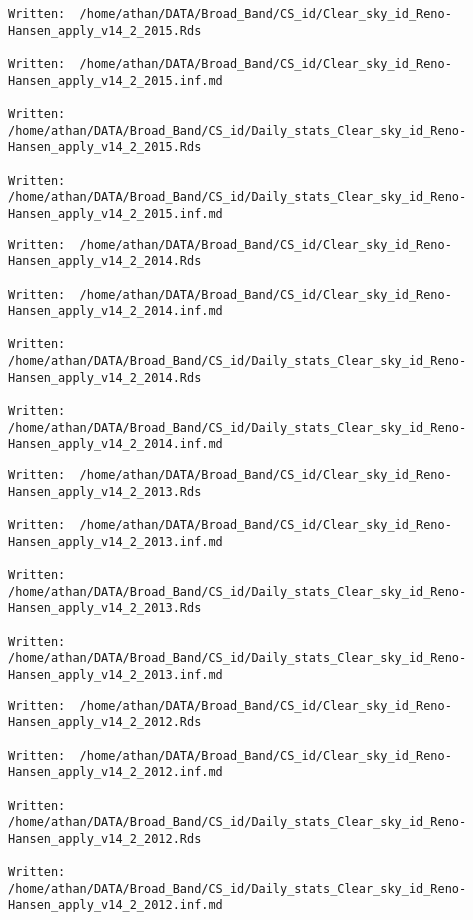 \documentclass[
  10pt,
  a4paper,oneside]{article}
\begin{document}
\begin{verbatim}
Written:  /home/athan/DATA/Broad_Band/CS_id/Clear_sky_id_Reno-Hansen_apply_v14_2_2015.Rds 

Written:  /home/athan/DATA/Broad_Band/CS_id/Clear_sky_id_Reno-Hansen_apply_v14_2_2015.inf.md 

Written:  /home/athan/DATA/Broad_Band/CS_id/Daily_stats_Clear_sky_id_Reno-Hansen_apply_v14_2_2015.Rds 

Written:  /home/athan/DATA/Broad_Band/CS_id/Daily_stats_Clear_sky_id_Reno-Hansen_apply_v14_2_2015.inf.md 
\end{verbatim}

\begin{verbatim}
Written:  /home/athan/DATA/Broad_Band/CS_id/Clear_sky_id_Reno-Hansen_apply_v14_2_2014.Rds 

Written:  /home/athan/DATA/Broad_Band/CS_id/Clear_sky_id_Reno-Hansen_apply_v14_2_2014.inf.md 

Written:  /home/athan/DATA/Broad_Band/CS_id/Daily_stats_Clear_sky_id_Reno-Hansen_apply_v14_2_2014.Rds 

Written:  /home/athan/DATA/Broad_Band/CS_id/Daily_stats_Clear_sky_id_Reno-Hansen_apply_v14_2_2014.inf.md 
\end{verbatim}

\begin{verbatim}
Written:  /home/athan/DATA/Broad_Band/CS_id/Clear_sky_id_Reno-Hansen_apply_v14_2_2013.Rds 

Written:  /home/athan/DATA/Broad_Band/CS_id/Clear_sky_id_Reno-Hansen_apply_v14_2_2013.inf.md 

Written:  /home/athan/DATA/Broad_Band/CS_id/Daily_stats_Clear_sky_id_Reno-Hansen_apply_v14_2_2013.Rds 

Written:  /home/athan/DATA/Broad_Band/CS_id/Daily_stats_Clear_sky_id_Reno-Hansen_apply_v14_2_2013.inf.md 
\end{verbatim}

\begin{verbatim}
Written:  /home/athan/DATA/Broad_Band/CS_id/Clear_sky_id_Reno-Hansen_apply_v14_2_2012.Rds 

Written:  /home/athan/DATA/Broad_Band/CS_id/Clear_sky_id_Reno-Hansen_apply_v14_2_2012.inf.md 

Written:  /home/athan/DATA/Broad_Band/CS_id/Daily_stats_Clear_sky_id_Reno-Hansen_apply_v14_2_2012.Rds 

Written:  /home/athan/DATA/Broad_Band/CS_id/Daily_stats_Clear_sky_id_Reno-Hansen_apply_v14_2_2012.inf.md 
\end{verbatim}
\end{document}
